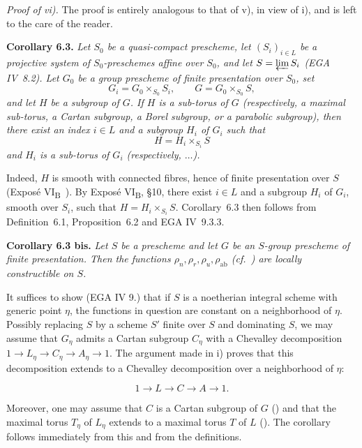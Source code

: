 \emph{Proof of vi).} The proof is entirely analogous to that of v), in view of i), and is left to the care of the reader.

\textbf{Corollary 6.3.} \emph{Let \(S_0\) be a quasi-compact
prescheme, let \((S_i)_{i\in L}\) be a projective system of
\(S_0\)-preschemes affine over \(S_0\), and let
\(S=\varprojlim S_i\) (EGA IV~8.2). Let \(G_0\) be a group
prescheme of finite presentation over \(S_0\), set
\[
  G_i=G_0\times_{S_0}S_i,\qquad G=G_0\times_{S_0}S,
\]
and let \(H\) be a subgroup of \(G\). If \(H\) is a sub-torus of
\(G\) (respectively, a maximal sub-torus, a Cartan subgroup, a Borel
subgroup, or a parabolic subgroup), then there exist an index
\(i\in L\) and a subgroup \(H_i\) of \(G_i\) such that
\[
  H=H_i\times_{S_i}S
\]
and \(H_i\) is a sub-torus of \(G_i\) (respectively, \(\ldots\)).}

Indeed, \(H\) is smooth with connected fibres, hence of finite
presentation over \(S\) (Exposé VI\textsubscript{B}~). By
Exposé VI\textsubscript{B}, \S10, there exist \(i\in L\) and a
subgroup \(H_i\) of \(G_i\), smooth over \(S_i\), such that
\(H=H_i\times_{S_i}S\). Corollary~6.3 then follows from
Definition~6.1, Proposition~6.2 and EGA IV~9.3.3.

\textbf{Corollary 6.3 bis.} \emph{Let \(S\) be a prescheme and let
\(G\) be an \(S\)-group prescheme of finite presentation. Then the
functions \(\rho_n,\rho_r,\rho_u,\rho_{\mathrm{ab}}\) (cf.~)
are locally constructible on \(S\).}

It suffices to show (EGA IV 9.) that if \(S\) is a noetherian integral scheme with generic point \(\eta\), the functions in
question are constant on a neighborhood of \(\eta\). Possibly replacing \(S\) by a scheme \(S'\) finite over \(S\) and
dominating \(S\), we may assume that \(G_{\eta}\) admits a Cartan subgroup \(C_{\eta}\) with a Chevalley decomposition \(1 \to
L_{\eta} \to C_{\eta} \to A_{\eta} \to 1\). The argument made in  i) proves that this decomposition extends to a
Chevalley decomposition over a neighborhood of \(\eta\):

\[ 1 \longrightarrow L \longrightarrow C \longrightarrow A \longrightarrow 1. \]

Moreover, one may assume that \(C\) is a Cartan subgroup of \(G\) () and that the maximal torus \(T_{\eta}\) of \(L_{\eta}\)
extends to a maximal torus \(T\) of \(L\) (). The corollary follows immediately from this and from the definitions.

